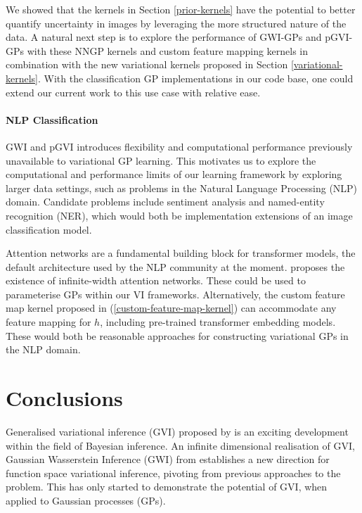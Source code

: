 \documentclass{article}
\numberwithin{equation}{section}
\begin{document}
We showed that the kernels in Section \ref{prior-kernels} have the potential to better quantify uncertainty in images by leveraging the more structured nature of the data.
A natural next step is to explore the performance of GWI-GPs and pGVI-GPs with these NNGP kernels and custom feature mapping kernels in combination with the new variational kernels proposed in Section \ref{variational-kernels}.
With the classification GP implementations in our code base, one could extend our current work to this use case with relative ease.

\paragraph{NLP Classification} GWI and pGVI introduces flexibility and computational performance previously unavailable to variational GP learning. 
This motivates us to explore the computational and performance limits of our learning framework by exploring larger data settings, such as problems in the Natural Language Processing (NLP) domain.
Candidate problems include sentiment analysis and named-entity recognition (NER), which would both be implementation extensions of an image classification model.

Attention networks are a fundamental building block for transformer models, the default architecture used by the NLP community at the moment. \cite{pmlr-v119-hron20a} proposes the existence of infinite-width attention networks.
These could be used to parameterise GPs within our VI frameworks.
Alternatively, the custom feature map kernel proposed in (\ref{custom-feature-map-kernel}) can accommodate any feature mapping for $h$, including pre-trained transformer embedding models. 
These would both be reasonable approaches for constructing variational GPs in the NLP domain.

\newpage
\section{Conclusions}\label{section:conclusions}
Generalised variational inference (GVI) proposed by \cite{knoblauch2022optimization} is an exciting development within the field of Bayesian inference.
An infinite dimensional realisation of GVI, Gaussian Wasserstein Inference (GWI) from \cite{wild2022generalized} establishes a new direction for function space variational inference, pivoting from previous approaches to the problem.
This has only started to demonstrate the potential of GVI, when applied to Gaussian processes (GPs). 
\end{document}
